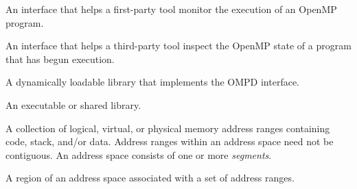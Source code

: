 \glossarydefstart
An interface that helps a first-party tool monitor the execution of an OpenMP program.
\glossarydefend

\glossarydefstart
An interface that helps a third-party tool inspect the OpenMP state of a program that has begun execution.
\glossarydefend

\glossarydefstart
A dynamically loadable library that implements the OMPD interface.
\glossarydefend

\glossarydefstart
An executable or shared library.
\glossarydefend


\glossarydefstart
A collection of logical, virtual, or physical memory address ranges containing code, stack, and/or data.
Address ranges within an address space need not be contiguous.  An address space consists of one or more \emph{segments}.
\glossarydefend

\glossarydefstart
A region of an address space associated with a set of address ranges.
\glossarydefend

\begin{comment}
\glossaryterm{architecture}
\glossarydefstart
A combination of the processor and the Application Binary Interface (ABI) used by
threads and address spaces.
\glossarydefend
\end{comment}

